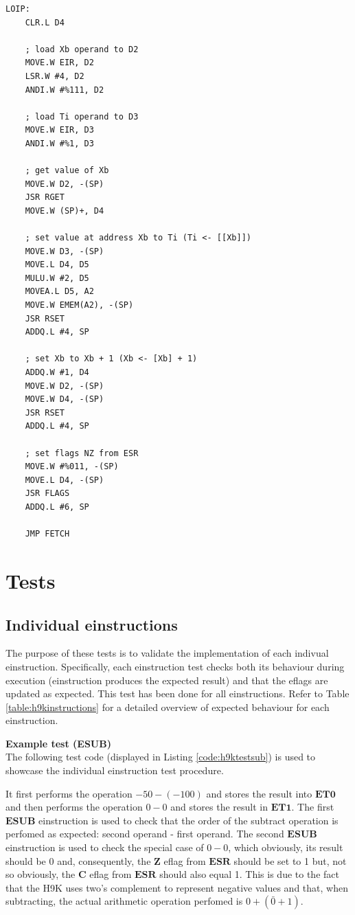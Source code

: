 \documentclass[11pt, a4paper]{article}
\begin{document}
\begin{lstlisting}[style=customasm, caption={HAL9000 LOIP instruction implementation}, label={code:h9eloipimpl}]
LOIP:
	CLR.L D4

	; load Xb operand to D2
	MOVE.W EIR, D2
	LSR.W #4, D2
	ANDI.W #%111, D2

	; load Ti operand to D3
	MOVE.W EIR, D3
	ANDI.W #%1, D3

	; get value of Xb
	MOVE.W D2, -(SP)
	JSR RGET
	MOVE.W (SP)+, D4

	; set value at address Xb to Ti (Ti <- [[Xb]])
	MOVE.W D3, -(SP)
	MOVE.L D4, D5
	MULU.W #2, D5
	MOVEA.L D5, A2
	MOVE.W EMEM(A2), -(SP)
	JSR RSET
	ADDQ.L #4, SP

	; set Xb to Xb + 1 (Xb <- [Xb] + 1)
	ADDQ.W #1, D4
	MOVE.W D2, -(SP)
	MOVE.W D4, -(SP)
	JSR RSET
	ADDQ.L #4, SP

	; set flags NZ from ESR
	MOVE.W #%011, -(SP)
	MOVE.L D4, -(SP)
	JSR FLAGS
	ADDQ.L #6, SP

	JMP FETCH
\end{lstlisting}

\pagebreak
\section{Tests}
\subsection{Individual einstructions}
The purpose of these tests is to validate the implementation of each indivual einstruction.
Specifically, each einstruction test checks both its behaviour during execution (einstruction
produces the expected result) and that the eflags are updated as expected. This test has been done
for all einstructions. Refer to Table \ref{table:h9kinstructions} for a detailed overview of
expected behaviour for each einstruction.

\textbf{Example test (ESUB)} \\
The following test code (displayed in Listing \ref{code:h9ktestsub}) is used to
showcase the individual einstruction test procedure.

It first performs the operation $-50 - (-100)$ and stores the
result into $\mathbf{ET0}$ and then performs the operation $0 - 0$ and stores the result in
$\mathbf{ET1}$. The first $\mathbf{ESUB}$ einstruction is used to check that the order of the
subtract operation is perfomed as expected: second operand - first operand. The second
$\mathbf{ESUB}$ einstruction is used to check the special case of $0 - 0$, which obviously, its
result should be 0 and, consequently, the $\mathbf{Z}$ eflag from $\mathbf{ESR}$ should be set to 1 but, not so obviously, the
$\mathbf{C}$ eflag from $\mathbf{ESR}$ should also equal 1. This is due to the fact that the H9K uses two's
complement to represent negative values and that, when subtracting, the actual arithmetic operation
perfomed is $0 + (\bar{0} + 1)$.
\end{document}
